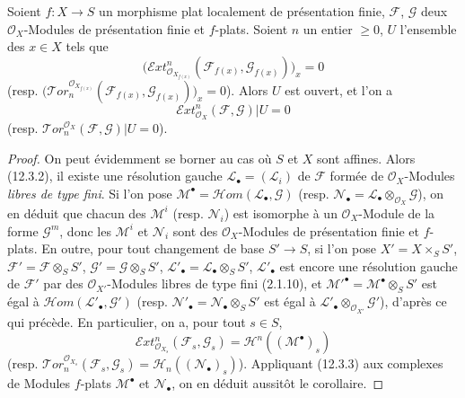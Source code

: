 \begin{corollary}[12.3.4]
\label{IV.12.3.4-fr}
Soient $f:X\to S$ un morphisme plat localement de présentation finie,
$\mathcal F$, $\mathcal G$ deux $\mathcal O_X$-Modules de présentation finie et
$f$-plats. Soient $n$ un entier $\geq0$, $U$ l'ensemble des $x\in X$ tels que
\[
  \bigl(\mathscr{E}\!xt^n_{\mathcal O_{X_{f(x)}}}
  (\mathcal F_{f(x)},\mathcal G_{f(x)})\bigr)_x=0
\]
(resp.
$\bigl(\mathscr{T}\!or_n^{\mathcal O_{X_{f(x)}}}
(\mathcal F_{f(x)},\mathcal G_{f(x)})\bigr)_x=0$). Alors $U$ est ouvert, et
l'on a
\[
  \mathscr{E}\!xt^n_{\mathcal O_X}(\mathcal F,\mathcal G)|U=0
\]
(resp.
$\mathscr{T}\!or_n^{\mathcal O_X}(\mathcal F,\mathcal G)|U=0$).
\end{corollary}

\begin{proof}
On peut évidemment se borner au cas où $S$ et $X$ sont affines. Alors (12.3.2),
il existe une résolution gauche $\mathcal L_\bullet=(\mathcal L_i)$ de
$\mathcal F$ formée de $\mathcal O_X$-Modules \emph{libres de type fini}. Si
l'on pose $\mathcal M^\bullet=\mathscr{H}\!om(\mathcal L_\bullet,\mathcal G)$
(resp. $\mathcal N_\bullet=\mathcal L_\bullet\otimes_{\mathcal O_X}\mathcal G$),
on en déduit que chacun des $\mathcal M^i$ (resp. $\mathcal N_i$) est isomorphe
à un $\mathcal O_X$-Module de la forme $\mathcal G^m$, donc les $\mathcal M^i$
et $\mathcal N_i$ sont des $\mathcal O_X$-Modules de présentation finie et
$f$-plats. En outre, pour tout changement de base $S'\to S$, si l'on pose
$X'=X\times_SS'$, $\mathcal F'=\mathcal F\otimes_SS'$,
$\mathcal G'=\mathcal G\otimes_SS'$, $\mathcal L'_\bullet
=\mathcal L_\bullet\otimes_SS'$, $\mathcal L'_\bullet$ est encore une
résolution gauche de $\mathcal F'$ par des $\mathcal O_{X'}$-Modules libres de
type fini (2.1.10), et $\mathcal M'^\bullet=\mathcal M^\bullet\otimes_SS'$ est
égal à $\mathscr{H}\!om(\mathcal L'_\bullet,\mathcal G')$ (resp.
$\mathcal N'_\bullet=\mathcal N_\bullet\otimes_SS'$ est égal à
$\mathcal L'_\bullet\otimes_{\mathcal O_{X'}}\mathcal G'$), d'après ce qui
précède. En particulier, on a, pour tout $s\in S$,
\[
  \mathscr{E}\!xt^n_{\mathcal O_{X_s}}(\mathcal F_s,\mathcal G_s)
  =\mathcal H^n((\mathcal M^\bullet)_s)
\]
(resp.
$\mathscr{T}\!or_n^{\mathcal O_{X_s}}(\mathcal F_s,\mathcal G_s)
=\mathcal H_n((\mathcal N_\bullet)_s)$). Appliquant (12.3.3) aux complexes de
Modules $f$-plats $\mathcal M^\bullet$ et $\mathcal N_\bullet$, on en déduit
aussitôt le corollaire.
\end{proof}

